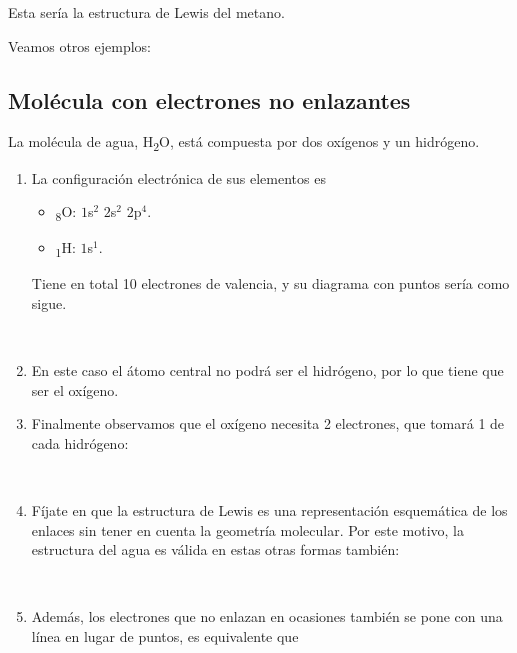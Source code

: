\documentclass[twoside,a4paper,justified,12pt]{tufte-handout}
\renewcommand{\sb}[1]{\textsubscript{#1}}
\begin{document}
Esta sería la estructura de Lewis del metano.

Veamos otros ejemplos:

\subsection{Molécula con electrones no enlazantes}

La molécula de agua, H\sb{2}O, está compuesta por dos oxígenos y un hidrógeno.

\begin{enumerate}[1)]
    \item La configuración electrónica de sus elementos es
    \begin{itemize}
        \item \sb{8}O: $1$s$^2$ $2$s$^2$ $2$p$^4$.
        \item \sb{1}H: $1$s$^1$.
    \end{itemize}
    
    Tiene en total 10 electrones de valencia, y su diagrama con puntos sería como sigue.
    
    {\centering{}\hspace{2em}\\}
    
    \item En este caso el átomo central no podrá ser el hidrógeno, por lo que tiene que ser el oxígeno.
    
    \item Finalmente observamos que el oxígeno necesita 2 electrones, que tomará 1 de cada hidrógeno:
        
     {\centering{}\\}
     
    \item Fíjate en que la estructura de Lewis es una representación esquemática de los enlaces sin tener en cuenta la geometría molecular. Por este motivo, la estructura del agua es válida en estas otras formas también:
    
    {\centering{}\hspace{2em}\hspace{2em}\hspace{2em}\hspace{2em}\\}
    
    \item Además, los electrones que no enlazan en ocasiones también se pone con una línea en lugar de puntos, es equivalente  que 
    
\end{enumerate}
\end{document}
